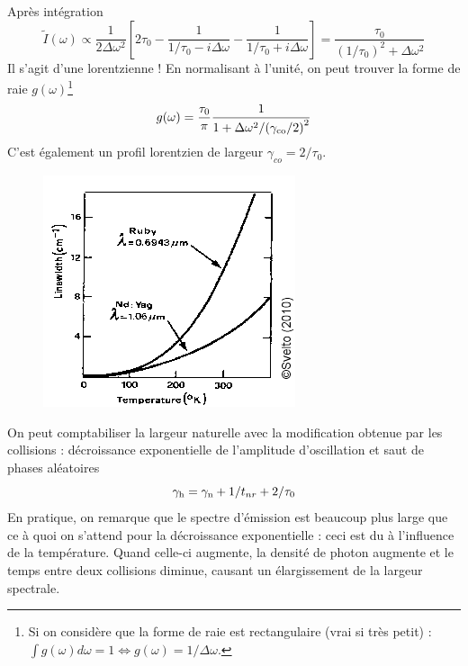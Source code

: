 	 Après intégration
	 \begin{equation}
	 \tilde I(\omega ) \propto \frac{1}{{2\Delta {\omega ^2}}}\left[ {2{\tau _0} - \frac{1}{{1/{\tau _0} - i\Delta \omega }} - \frac{1}{{1/{\tau _0} + i\Delta \omega }}} \right] = \frac{{{\tau _0}}}{{{{(1/{\tau _0})}^2} + \Delta {\omega ^2}}}
	 \end{equation}
	 Il s'agit d'une lorentzienne ! En normalisant à l'unité, on peut trouver la forme de 
	 raie $g(\omega)$\footnote{Si on considère que la forme de raie est rectangulaire (vrai 
	 si très petit) : $\int g(\omega)d\omega = 1\Leftrightarrow g(\omega) = 1/\Delta\omega$.}
	 \begin{equation}
	 g(\omega ) = \frac{{{\tau _0}}}{\pi }\frac{1}{{1 + \Delta {\omega ^2}/{{({\gamma _{{\rm{co}}}}/2)}^2}}}
	 \end{equation}
	 C'est également un profil lorentzien de largeur $\gamma_{co} = 2/\tau_0$.
	 
	 \newpage
	 	\begin{figure}
	\vspace{-3mm}
	\includegraphics[scale=0.65]{ch2/image21.png}
	\end{figure}
	 On peut comptabiliser la largeur naturelle avec la modification obtenue par les collisions : 
	 décroissance exponentielle de l'amplitude d'oscillation et saut de phases aléatoires
	 \begin{equation}
	 {\gamma _{\rm{h}}} = {\gamma _{\rm{n}}} + 1/{t_{nr}} + 2/{\tau _0}
	 \end{equation}
	 En pratique, on remarque que le spectre d'émission est beaucoup plus large que ce à quoi 
	 on s'attend pour la décroissance exponentielle : ceci est du à l'influence de la température. 
	 Quand celle-ci augmente, la densité de photon augmente et le temps entre deux collisions diminue,
	 causant un élargissement de la largeur spectrale.
	 

